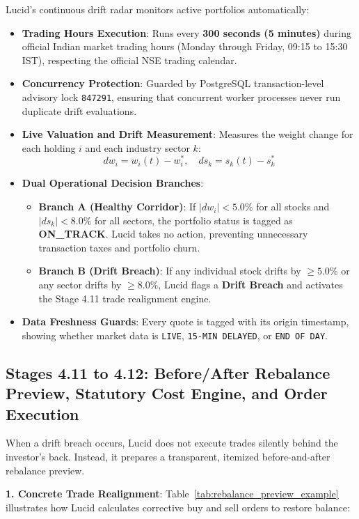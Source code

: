 Lucid's continuous drift radar monitors active portfolios automatically:
\begin{itemize}
    \item \textbf{Trading Hours Execution}: Runs every \textbf{300 seconds (5 minutes)} during official Indian market trading hours (Monday through Friday, 09:15 to 15:30 IST), respecting the official NSE trading calendar.
    \item \textbf{Concurrency Protection}: Guarded by PostgreSQL transaction-level advisory lock \texttt{847291}, ensuring that concurrent worker processes never run duplicate drift evaluations.
    \item \textbf{Live Valuation and Drift Measurement}: Measures the weight change for each holding $i$ and each industry sector $k$:
    \begin{equation}
    dw_i = w_i(t) - w_i^*, \quad ds_k = s_k(t) - s_k^*
    \end{equation}
    \item \textbf{Dual Operational Decision Branches}:
    \begin{itemize}
        \item \textbf{Branch A (Healthy Corridor)}: If $|dw_i| < 5.0\%$ for all stocks and $|ds_k| < 8.0\%$ for all sectors, the portfolio status is tagged as \textbf{ON\_TRACK}. Lucid takes no action, preventing unnecessary transaction taxes and portfolio churn.
        \item \textbf{Branch B (Drift Breach)}: If any individual stock drifts by $\ge 5.0\%$ or any sector drifts by $\ge 8.0\%$, Lucid flags a \textbf{Drift Breach} and activates the Stage 4.11 trade realignment engine.
    \end{itemize}
    \item \textbf{Data Freshness Guards}: Every quote is tagged with its origin timestamp, showing whether market data is \texttt{LIVE}, \texttt{15-MIN DELAYED}, or \texttt{END OF DAY}.
\end{itemize}

\subsection{Stages 4.11 to 4.12: Before/After Rebalance Preview, Statutory Cost Engine, and Order Execution}
When a drift breach occurs, Lucid does not execute trades silently behind the investor's back. Instead, it prepares a transparent, itemized before-and-after rebalance preview.

\noindent \textbf{1. Concrete Trade Realignment}:
Table~\ref{tab:rebalance_preview_example} illustrates how Lucid calculates corrective buy and sell orders to restore balance:

